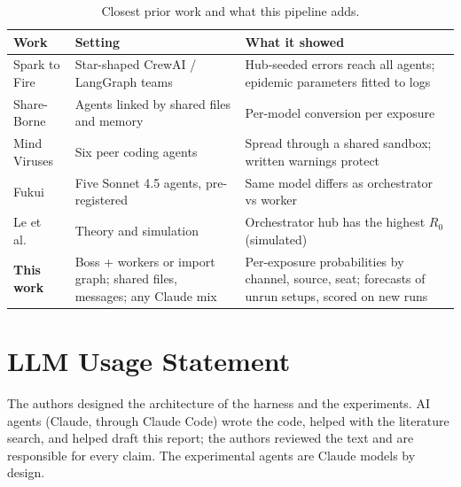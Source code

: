 \documentclass[11pt]{article}
\begin{document}
\begin{table}[h]
\centering\small
\begin{tabularx}{\textwidth}{@{}l X X@{}}
\toprule
Work & Setting & What it showed \\
\midrule
Spark to Fire \cite{spark} & Star-shaped CrewAI / LangGraph teams & Hub-seeded errors reach all agents; epidemic parameters fitted to logs \\
Share-Borne \cite{share} & Agents linked by shared files and memory & Per-model conversion per exposure \\
Mind Viruses \cite{mind} & Six peer coding agents & Spread through a shared sandbox; written warnings protect \\
Fukui \cite{fukui} & Five Sonnet 4.5 agents, pre-registered & Same model differs as orchestrator vs worker \\
Le et al.\ \cite{crosslayer} & Theory and simulation & Orchestrator hub has the highest $R_0$ (simulated) \\
\midrule
\textbf{This work} & Boss + workers or import graph; shared files, messages; any Claude mix & Per-exposure probabilities by channel, source, seat; forecasts of unrun setups, scored on new runs \\
\bottomrule
\end{tabularx}
\caption{Closest prior work and what this pipeline adds.}
\label{tab:related}
\end{table}

\section*{LLM Usage Statement}
The authors designed the architecture of the harness and the experiments. AI agents (Claude, through Claude Code) wrote the code, helped with the literature search, and helped draft this report; the authors reviewed the text and are responsible for every claim. The experimental agents are Claude models by design.
\end{document}
